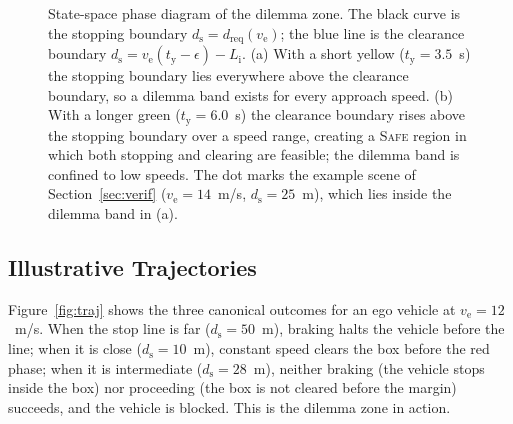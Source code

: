 \documentclass[conference, a4paper]{IEEEtran}
\theoremstyle{plain}
\newcommand{\dreq}{d_{\mathrm{req}}}
\newcommand{\ds}{d_{\mathrm{s}}}
\newcommand{\tred}{t_{\mathrm{y}}}
\newcommand{\Li}{L_{\mathrm{i}}}
\newcommand{\ve}{v_{\mathrm{e}}}
\begin{document}
\begin{figure}[t]
\caption{State-space phase diagram of the dilemma zone. The black curve is
the stopping boundary $\ds = \dreq(\ve)$; the blue line is the clearance
boundary $\ds = \ve(\tred-\epsilon) - \Li$. (a) With a short yellow
($\tred = 3.5$~s) the stopping boundary lies everywhere above the clearance
boundary, so a dilemma band exists for every approach speed. (b) With a
longer green ($\tred = 6.0$~s) the clearance boundary rises above the
stopping boundary over a speed range, creating a \textsc{Safe} region in
which both stopping and clearing are feasible; the dilemma band is confined
to low speeds. The dot marks the example scene of
Section~\ref{sec:verif} ($\ve = 14$~m/s, $\ds = 25$~m), which lies inside the
dilemma band in (a).}
\label{fig:dilemma}
\end{figure}

\subsection{Illustrative Trajectories}
\label{subsec:traj}

Figure~\ref{fig:traj} shows the three canonical outcomes for an ego vehicle
at $\ve = 12$~\si{m/s}. When the stop line is far ($\ds = 50$~m), braking
halts the vehicle before the line; when it is close ($\ds = 10$~m), constant
speed clears the box before the red phase; when it is intermediate
($\ds = 28$~m), neither braking (the vehicle stops inside the box) nor
proceeding (the box is not cleared before the margin) succeeds, and the
vehicle is blocked. This is the dilemma zone in action.
\end{document}
